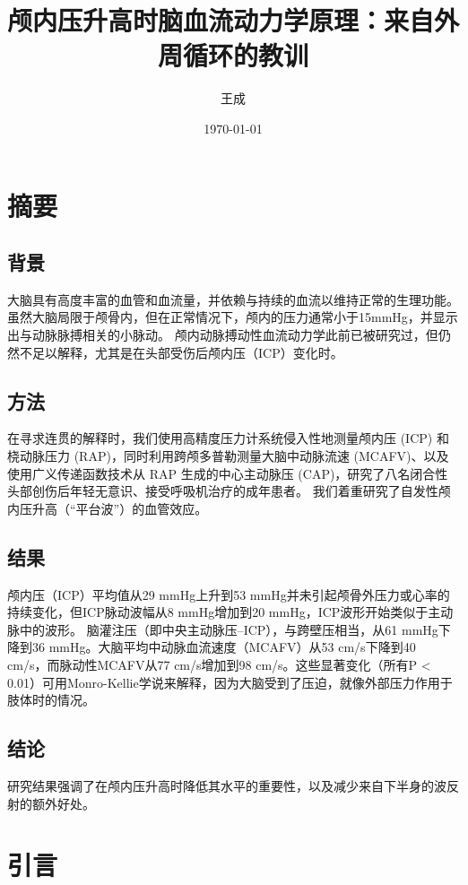 \documentclass[12pt]{article}
\title{颅内压升高时脑血流动力学原理：来自外周循环的教训}
\author{王成}
\date{\today}
\begin{document}
\maketitle
\newpage

\tableofcontents
\newpage

\section{摘要}
\subsection{背景}
大脑具有高度丰富的血管和血流量，并依赖与持续的血流以维持正常的生理功能。
虽然大脑局限于颅骨内，但在正常情况下，颅内的压力通常小于15mmHg，并显示出与动脉脉搏相关的小脉动。
颅内动脉搏动性血流动力学此前已被研究过，但仍然不足以解释，尤其是在头部受伤后颅内压（ICP）变化时。

\subsection{方法}
在寻求连贯的解释时，我们使用高精度压力计系统侵入性地测量颅内压 (ICP) 和桡动脉压力 (RAP)，同时利用跨颅多普勒测量大脑中动脉流速 (MCAFV)、以及使用广义传递函数技术从 R​​AP 生成的中心主动脉压 (CAP)，研究了八名闭合性头部创伤后年轻无意识、接受呼吸机治疗的成年患者。
我们着重研究了自发性颅内压升高（“平台波”）的血管效应。

\subsection{结果}
颅内压（ICP）平均值从29 mmHg上升到53 mmHg并未引起颅骨外压力或心率的持续变化，但ICP脉动波幅从8 mmHg增加到20 mmHg，ICP波形开始类似于主动脉中的波形。
脑灌注压（即中央主动脉压–ICP），与跨壁压相当，从61 mmHg下降到36 mmHg。大脑平均中动脉血流速度（MCAFV）从53 cm/s下降到40 cm/s，而脉动性MCAFV从77 cm/s增加到98 cm/s。这些显著变化（所有P < 0.01）可用Monro-Kellie学说来解释，因为大脑受到了压迫，就像外部压力作用于肢体时的情况。

\subsection{结论}
研究结果强调了在颅内压升高时降低其水平的重要性，以及减少来自下半身的波反射的额外好处。

\section{引言}
\end{document}
